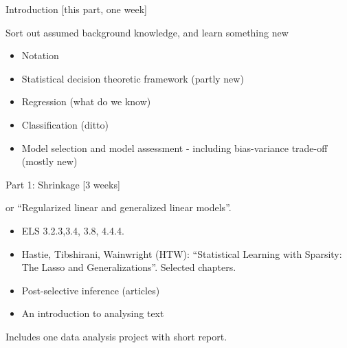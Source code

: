 \documentclass[
  ignorenonframetext,
]{beamer}
\providecommand{\tightlist}{%
  \setlength{\itemsep}{0pt}\setlength{\parskip}{0pt}}
\begin{document}
\begin{frame}

\begin{block}{Introduction {[}this part, one week{]}}

Sort out assumed background knowledge, and learn something new

\begin{itemize}
\tightlist
\item
  Notation
\item
  Statistical decision theoretic framework (partly new)
\item
  Regression (what do we know)
\item
  Classification (ditto)
\item
  Model selection and model assessment - including bias-variance
  trade-off (mostly new)
\end{itemize}

\end{block}

\end{frame}

\begin{frame}

\begin{block}{Part 1: Shrinkage {[}3 weeks{]}}

or ``Regularized linear and generalized linear models''.

\begin{itemize}
\tightlist
\item
  ELS 3.2.3,3.4, 3.8, 4.4.4.
\item
  Hastie, Tibshirani, Wainwright (HTW): ``Statistical Learning with
  Sparsity: The Lasso and Generalizations''. Selected chapters.
\item
  Post-selective inference (articles)
\item
  An introduction to analysing text
\end{itemize}

Includes one data analysis project with short report.

\end{block}

\end{frame}
\end{document}
